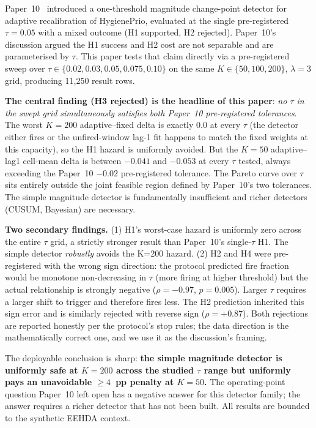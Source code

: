 Paper~10~\cite{paper10adaptive} introduced a one-threshold magnitude
change-point detector for adaptive recalibration of HygienePrio,
evaluated at the single pre-registered $\tau = 0.05$ with a mixed
outcome (H1 supported, H2 rejected). Paper~10's discussion argued the
H1 success and H2 cost are not separable and are parameterised by
$\tau$. This paper tests that claim directly via a pre-registered
sweep over $\tau \in \{0.02, 0.03, 0.05, 0.075, 0.10\}$ on the
same $K \in \{50, 100, 200\}$, $\lambda = 3$ grid, producing 11{,}250
result rows.

\textbf{The central finding (H3 rejected) is the headline of this
paper}: \textit{no $\tau$ in the swept grid simultaneously satisfies
both Paper~10 pre-registered tolerances}. The worst $K = 200$ adaptive--fixed
delta is exactly $0.0$ at every $\tau$ (the detector either fires or
the unfired-window lag-1 fit happens to match the fixed weights at
this capacity), so the H1 hazard is uniformly avoided. But the
$K = 50$ adaptive--lag1 cell-mean delta is between $-0.041$ and
$-0.053$ at every $\tau$ tested, always exceeding the Paper~10
$-0.02$ pre-registered tolerance. The Pareto curve over $\tau$
sits entirely outside the joint feasible region defined by Paper~10's
two tolerances. The simple magnitude detector is fundamentally
insufficient and richer detectors (CUSUM, Bayesian) are necessary.

\textbf{Two secondary findings.} (1) H1's worst-case hazard is
uniformly zero across the entire $\tau$ grid, a strictly stronger
result than Paper~10's single-$\tau$ H1. The simple detector
\textit{robustly} avoids the K=200 hazard. (2) H2 and H4 were
pre-registered with the wrong sign direction: the protocol predicted
fire fraction would be monotone non-decreasing in $\tau$ (more firing
at higher threshold) but the actual relationship is strongly
negative ($\rho = -0.97$, $p = 0.005$). Larger $\tau$ requires a
larger shift to trigger and therefore fires less. The H2 prediction
inherited this sign error and is similarly rejected with reverse sign
($\rho = +0.87$). Both rejections are reported honestly per the
protocol's stop rules; the data direction is the mathematically
correct one, and we use it as the discussion's framing.

The deployable conclusion is sharp: \textbf{the simple magnitude
detector is uniformly safe at $K = 200$ across the studied $\tau$
range but uniformly pays an unavoidable $\geq 4$~pp penalty at
$K = 50$.} The operating-point question Paper~10 left open has a
negative answer for this detector family; the answer requires a
richer detector that has not been built. All results are bounded to
the synthetic EEHDA context.
